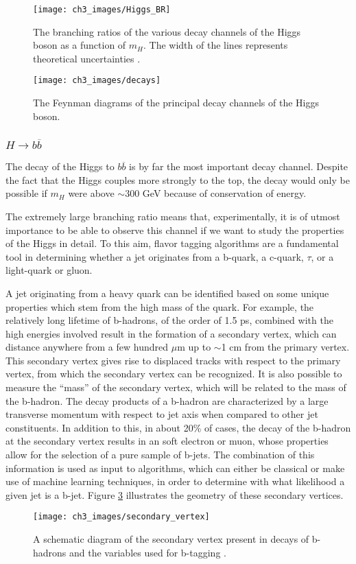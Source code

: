 \documentclass[10pt,a4paper]{book}
\begin{document}
\begin{figure}
\centering
\texttt{[image: ch3\_images/Higgs\_BR]}
\caption{The branching ratios of the various decay channels of the Higgs boson as a function of $m_H$. The width of the lines represents theoretical uncertainties \cite{LHCHiggsCrossSectionWorkingGroup:2013rie}.}
\label{Higgs branching ratios}
\end{figure}

\begin{figure}
\centering
\texttt{[image: ch3\_images/decays]}
\caption{The Feynman diagrams of the principal decay channels of the Higgs boson.}
\label{decays}
\end{figure}

\subsubsection{$H\rightarrow b\overline{b}$}

The decay of the Higgs to $b\overline{b}$ is by far the most important decay channel. Despite the fact that the Higgs couples more strongly to the top, the decay would only be possible if $m_H$ were above $\sim300$ GeV because of conservation of energy. 

The extremely large branching ratio means that, experimentally, it is of utmost importance to be able to observe this channel if we want to study the properties of the Higgs in detail. To this aim, flavor tagging algorithms are a fundamental tool in determining whether a jet originates from a b-quark, a c-quark, $\tau$, or a light-quark or gluon. 

A jet originating from a heavy quark can be identified based on some unique properties which stem from the high mass of the quark. For example, the relatively long lifetime of b-hadrons, of the order of 1.5 ps, combined with the high energies involved result in the formation of a secondary vertex, which can distance anywhere from a few hundred $\mu$m up to $\sim$1 cm from the primary vertex. This secondary vertex gives rise to displaced tracks with respect to the primary vertex, from which the secondary vertex can be recognized. It is also possible to measure the ``mass'' of the secondary vertex, which will be related to the mass of the b-hadron. The decay products of a b-hadron are characterized by a large transverse momentum with respect to jet axis when compared to other jet constituents. In addition to this, in about 20\% of cases, the decay of the b-hadron at the secondary vertex results in an soft electron or muon, whose properties allow for the selection of a pure sample of b-jets. The combination of this information is used as input to algorithms, which can either be classical or make use of machine learning techniques, in order to determine with what likelihood a given jet is a b-jet. Figure \ref{secondary vertex} illustrates the geometry of these secondary vertices.
\begin{figure}
\centering
\texttt{[image: ch3\_images/secondary\_vertex]}
\caption{A schematic diagram of the secondary vertex present in decays of b-hadrons and the variables used for b-tagging \cite{CMS:2017wtu}.}
\label{secondary vertex}
\end{figure}
\end{document}
